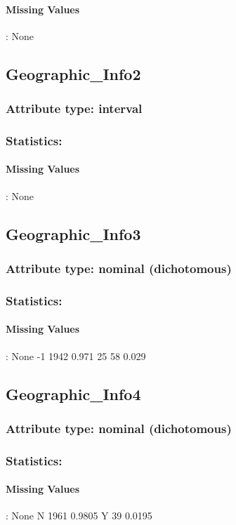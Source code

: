 \paragraph{Missing Values}: None

\subsection{Geographic\_Info2}
\subsubsection{Attribute type: interval}
\subsubsection{Statistics: }
\paragraph{Missing Values}: None

\subsection{Geographic\_Info3}
\subsubsection{Attribute type: nominal (dichotomous)}
\subsubsection{Statistics: }
\paragraph{Missing Values}: None
-1	1942	0.971
25	58	0.029

\subsection{Geographic\_Info4}
\subsubsection{Attribute type: nominal (dichotomous)}
\subsubsection{Statistics: }
\paragraph{Missing Values}: None
N	1961	0.9805
Y	39	0.0195

